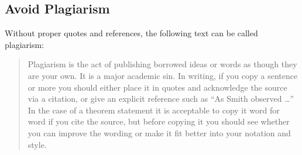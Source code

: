 \subsection{Avoid Plagiarism}
Without proper quotes and references, the following text can be called plagiarism:
\begin{quotation}
	Plagiarism is the act of publishing borrowed ideas or words as though they are your own. It is a major academic sin. In writing, if you copy a sentence or more you should either place it in quotes and acknowledge the source via a citation, or give an explicit reference such as ``As Smith observed \ldots'' In the case of a theorem statement it is acceptable to copy it word for word if you cite the source, but before copying it you should see whether you can improve the wording or make it fit better into your notation and style.\cite{Nicholas1998Handbook}
\end{quotation}



\nocite{2013数学之英文写作,Nicholas1998Handbook}

